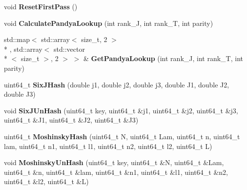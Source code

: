 \begin{DoxyCompactItemize}
\item 
\hypertarget{classModelSpace_a3354ef5c4dbcae5786759696ab500951}{void {\bfseries Reset\-First\-Pass} ()}\label{classModelSpace_a3354ef5c4dbcae5786759696ab500951}

\item 
\hypertarget{classModelSpace_abe6a15d78c5a16e707a02e5d2341f1f0}{void {\bfseries Calculate\-Pandya\-Lookup} (int rank\-\_\-\-J, int rank\-\_\-\-T, int parity)}\label{classModelSpace_abe6a15d78c5a16e707a02e5d2341f1f0}

\item 
\hypertarget{classModelSpace_a7792f4bbaa7c3fbac013a5ee5fc7d679}{std\-::map$<$ std\-::array$<$ size\-\_\-t, 2 $>$\\*
, std\-::array$<$ std\-::vector\\*
$<$ size\-\_\-t $>$, 2 $>$ $>$ \& {\bfseries Get\-Pandya\-Lookup} (int rank\-\_\-\-J, int rank\-\_\-\-T, int parity)}\label{classModelSpace_a7792f4bbaa7c3fbac013a5ee5fc7d679}

\item 
\hypertarget{classModelSpace_a6727d45bfcee5a6aa9181da6802fc948}{uint64\-\_\-t {\bfseries Six\-J\-Hash} (double j1, double j2, double j3, double J1, double J2, double J3)}\label{classModelSpace_a6727d45bfcee5a6aa9181da6802fc948}

\item 
\hypertarget{classModelSpace_a074b15f27c3c302e5594ce1bc03d774a}{void {\bfseries Six\-J\-Un\-Hash} (uint64\-\_\-t key, uint64\-\_\-t \&j1, uint64\-\_\-t \&j2, uint64\-\_\-t \&j3, uint64\-\_\-t \&J1, uint64\-\_\-t \&J2, uint64\-\_\-t \&J3)}\label{classModelSpace_a074b15f27c3c302e5594ce1bc03d774a}

\item 
\hypertarget{classModelSpace_a5503bab63a0392cf5914fb897f623003}{uint64\-\_\-t {\bfseries Moshinsky\-Hash} (uint64\-\_\-t N, uint64\-\_\-t Lam, uint64\-\_\-t n, uint64\-\_\-t lam, uint64\-\_\-t n1, uint64\-\_\-t l1, uint64\-\_\-t n2, uint64\-\_\-t l2, uint64\-\_\-t L)}\label{classModelSpace_a5503bab63a0392cf5914fb897f623003}

\item 
\hypertarget{classModelSpace_a3b58b32f835092158b45b82101e4ad5a}{void {\bfseries Moshinsky\-Un\-Hash} (uint64\-\_\-t key, uint64\-\_\-t \&N, uint64\-\_\-t \&Lam, uint64\-\_\-t \&n, uint64\-\_\-t \&lam, uint64\-\_\-t \&n1, uint64\-\_\-t \&l1, uint64\-\_\-t \&n2, uint64\-\_\-t \&l2, uint64\-\_\-t \&L)}\label{classModelSpace_a3b58b32f835092158b45b82101e4ad5a}

\end{DoxyCompactItemize}
